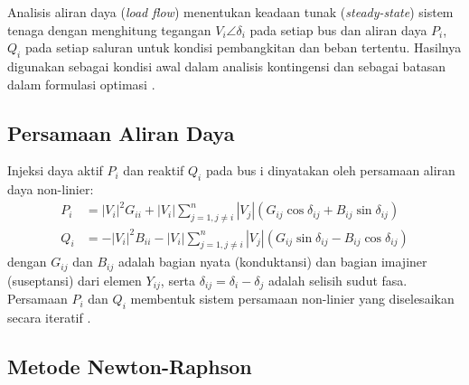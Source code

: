Analisis aliran daya (\textit{load flow}) menentukan keadaan tunak (\textit{steady-state}) sistem tenaga dengan menghitung tegangan $V_{i}\angle\delta_{i}$ pada setiap bus dan aliran daya $P_{i}$, $Q_{i}$ pada setiap saluran untuk kondisi pembangkitan dan beban tertentu. Hasilnya digunakan sebagai kondisi awal dalam analisis kontingensi dan sebagai batasan dalam formulasi optimasi \cite{Bergen2000, Farivar2013}.

\subsection{Persamaan Aliran Daya}
\label{subsec:Persamaan_Aliran_Daya}

Injeksi daya aktif $P_{i}$ dan reaktif $Q_{i}$ pada bus i dinyatakan oleh persamaan aliran daya non-linier:
\begin{equation}
\begin{aligned}
    P_{i} &= |V_{i}|^{2}G_{ii}+|V_{i}|\sum_{j=1,j\ne i}^{n}|V_{j}|(G_{ij}\cos\delta_{ij}+B_{ij}\sin\delta_{ij}) \\
    Q_{i} &= -|V_{i}|^{2}B_{ii}-|V_{i}|\sum_{j=1,j\ne i}^{n}|V_{j}|(G_{ij}\sin\delta_{ij}-B_{ij}\cos\delta_{ij})
\end{aligned}
\end{equation}
dengan $G_{ij}$ dan $B_{ij}$ adalah bagian nyata (konduktansi) dan bagian imajiner (suseptansi) dari elemen $Y_{ij}$, serta $\delta_{ij}=\delta_{i}-\delta_{j}$ adalah selisih sudut fasa. Persamaan $P_{i}$ dan $Q_{i}$ membentuk sistem persamaan non-linier yang diselesaikan secara iteratif \cite{Bergen2000}.

\subsection{Metode Newton-Raphson}
\label{subsec:Metode_Newton_Raphson}

